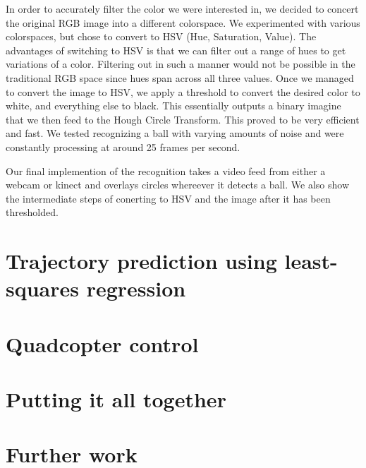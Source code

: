 \documentclass{article}
\begin{document}
In order to accurately filter the color we were interested in, we decided to concert the original
RGB image into a different colorspace. We experimented with various colorspaces, but chose to
convert to HSV (Hue, Saturation, Value). The advantages of switching to HSV is that we can filter
out a range of hues to get variations of a color. Filtering out in such a manner would not be
possible in the traditional RGB space since hues span across all three values. Once we managed
to convert the image to HSV, we apply a threshold to convert the desired color to white, and
everything else to black. This essentially outputs a binary imagine that we then feed to the
Hough Circle Transform. This proved to be very efficient and fast. We tested recognizing a ball
with varying amounts of noise and were constantly processing at around 25 frames per second.

Our final implemention of the recognition takes a video feed from either a webcam or kinect
and overlays circles whereever it detects a ball. We also show the intermediate steps of conerting
to HSV and the image after it has been thresholded.

\section{Trajectory prediction using least-squares regression}

\section{Quadcopter control}

\section{Putting it all together}

\section{Further work}
\end{document}
